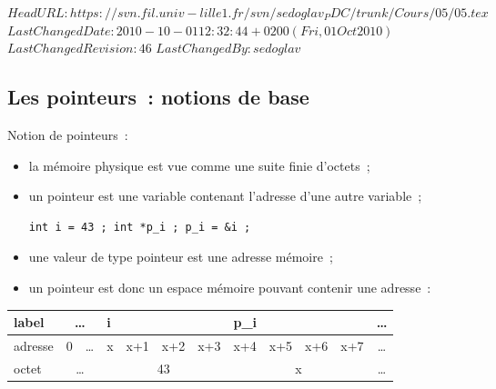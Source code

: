 \svnidlong 
{$HeadURL: https://svn.fil.univ-lille1.fr/svn/sedoglav_PDC/trunk/Cours/05/05.tex $} 
{$LastChangedDate: 2010-10-01 12:32:44 +0200 (Fri, 01 Oct 2010) $} 
{$LastChangedRevision: 46 $} 
{$LastChangedBy: sedoglav $} 
\begin{frame}[fragile]
    \section{Les pointeurs~: notions de base}
    Notion de pointeurs~:
    \begin{itemize}
    \item la m\'emoire physique est vue comme une suite finie
      d'octets~;
    \item un pointeur est une variable contenant l'adresse d'une autre variable~;
\begin{verbatim}
int i = 43 ; int *p_i ; p_i = &i ;
\end{verbatim}
    \item une valeur de type pointeur est une adresse m\'emoire~;
    \item un pointeur est donc un espace m\'emoire pouvant contenir
      une adresse~:
    \end{itemize}
    \par\bigskip
    \begin{footnotesize}
      \begin{center}
        \begin{tabular}{|l|c|c|c|c|c|c|c|c|c|c|c|}
          \hline
          label&\multicolumn{2}{c}{\ldots}\vline&\multicolumn{4}{l}{i}\vline
         &\multicolumn{4}{l}{p\_i}\vline&\ldots
          \\
          \hline
          adresse&0&\ldots         &x &x+1& x+2&x+3&x+4&x+5&x+6& x+7& \ldots
          \\    \hline
          octet&\multicolumn{2}{c}{\ldots}\vline&\multicolumn{4}{c}{43}\vline&\multicolumn{4}{c}{x}\vline&\ldots
          \\
          \hline
        \end{tabular}    
      \end{center}
    \end{footnotesize}
\end{frame}

